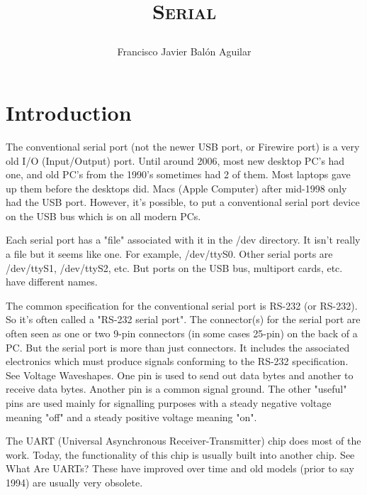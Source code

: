 \documentclass[11pt, twosides, titlepage]{article}
\title{{\scshape\Huge Serial\par}}
\author{Francisco Javier Balón Aguilar}
\begin{document}
\maketitle
\renewcommand{\contentsname}{Index} %
\tableofcontents %
\newpage



\section{Introduction}

    The conventional serial port (not the newer USB port, or Firewire port) is a very old I/O (Input/Output) port. Until around 2006, most new desktop PC's had one, and old PC's from the 1990's sometimes had 2 of them. Most laptops gave up them before the desktops did. Macs (Apple Computer) after mid-1998 only had the USB port. However, it's possible, to put a conventional serial port device on the USB bus which is on all modern PCs.

    Each serial port has a "file" associated with it in the /dev directory. It isn't really a file but it seems like one. For example, /dev/ttyS0. Other serial ports are /dev/ttyS1, /dev/ttyS2, etc. But ports on the USB bus, multiport cards, etc. have different names.

    The common specification for the conventional serial port is RS-232 (or RS-232). So it's often called a "RS-232 serial port". The connector(s) for the serial port are often seen as one or two 9-pin connectors (in some cases 25-pin) on the back of a PC. But the serial port is more than just connectors. It includes the associated electronics which must produce signals conforming to the RS-232 specification. See Voltage Waveshapes. One pin is used to send out data bytes and another to receive data bytes. Another pin is a common signal ground. The other "useful" pins are used mainly for signalling purposes with a steady negative voltage meaning "off" and a steady positive voltage meaning "on".

    The UART (Universal Asynchronous Receiver-Transmitter) chip does most of the work. Today, the functionality of this chip is usually built into another chip. See What Are UARTs? These have improved over time and old models (prior to say 1994) are usually very obsolete.
\end{document}
